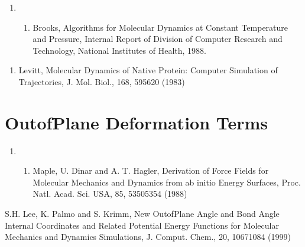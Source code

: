 \documentclass[letterpaper,11pt,english]{sphinxmanual}
\begin{document}
\begin{enumerate}
%
\setcounter{enumi}{1}
\item {} \begin{enumerate}
%
\setcounter{enumii}{17}
\item {} 
Brooks, Algorithms for Molecular Dynamics at Constant Temperature and Pressure, Internal Report of Division of Computer Research and Technology, National Institutes of Health, 1988.

\end{enumerate}

\end{enumerate}
\begin{enumerate}
%
\setcounter{enumi}{12}
\item {} 
Levitt, Molecular Dynamics of Native Protein: Computer Simulation of Trajectories, J. Mol. Biol., 168, 595\sphinxhyphen{}620 (1983)

\end{enumerate}


\section{Out\sphinxhyphen{}of\sphinxhyphen{}Plane Deformation Terms}
\label{\detokenize{text/references:out-of-plane-deformation-terms}}\begin{enumerate}
%
\setcounter{enumi}{9}
\item {} \begin{enumerate}
%
\setcounter{enumii}{17}
\item {} 
Maple, U. Dinar and A. T. Hagler, Derivation of Force Fields for Molecular Mechanics and Dynamics from ab initio Energy Surfaces, Proc. Natl. Acad. Sci. USA, 85, 5350\sphinxhyphen{}5354 (1988)

\end{enumerate}

\end{enumerate}

S.\sphinxhyphen{}H. Lee, K. Palmo and S. Krimm, New Out\sphinxhyphen{}of\sphinxhyphen{}Plane Angle and Bond Angle Internal Coordinates and Related Potential Energy Functions for Molecular Mechanics and Dynamics Simulations, J. Comput. Chem., 20, 1067\sphinxhyphen{}1084 (1999)
\end{document}
